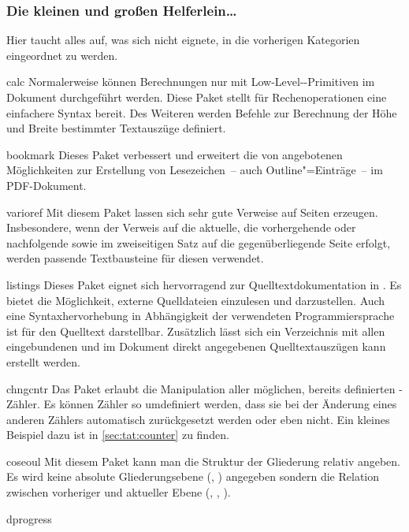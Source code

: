 \documentclass[%
  english,ngerman,%
  headings=optiontoheadandtoc,captions=tableheading,numbers=noenddot,%
  chapterpage,cdfoot,%
]{tudscrman}
\begin{document}
\subsubsection{Die kleinen und großen Helferlein\dots}
Hier taucht alles auf, was sich nicht eignete, in die vorherigen Kategorien 
eingeordnet zu werden.
\begin{packages}
\item[calc]
  Normalerweise können Berechnungen nur mit Low-Level--Primitiven im 
  Dokument durchgeführt werden. Diese Paket stellt für Rechenoperationen eine 
  einfachere Syntax bereit. Des Weiteren werden Befehle zur Berechnung der Höhe
  und Breite bestimmter Textauszüge definiert.
\item[bookmark]
  Dieses Paket verbessert und erweitert die von  angebotenen 
  Möglichkeiten zur Erstellung von Lesezeichen~-- auch Outline"=Einträge~-- im 
  PDF-Dokument.
\item[varioref]
  Mit diesem Paket lassen sich sehr gute Verweise auf Seiten erzeugen. 
  Insbesondere, wenn der Verweis auf die aktuelle, die vorhergehende oder 
  nachfolgende sowie im zweiseitigen Satz auf die gegenüberliegende Seite 
  erfolgt, werden passende Textbausteine für diesen verwendet.
\item[listings]
  Dieses Paket eignet sich hervorragend zur Quelltextdokumentation in 
  . Es bietet die Möglichkeit, externe Quelldateien einzulesen und 
  darzustellen. Auch eine Syntaxhervorhebung in Abhängigkeit der verwendeten 
  Programmiersprache ist für den Quelltext darstellbar. Zusätzlich lässt sich 
  ein Verzeichnis mit allen eingebundenen und im Dokument direkt angegebenen 
  Quelltextauszügen kann erstellt werden.
\item[chngcntr]
  Das Paket erlaubt die Manipulation aller möglichen, bereits definierten 
  -Zähler. Es können Zähler so umdefiniert werden, dass sie bei 
  der Änderung eines anderen Zählers automatisch zurückgesetzt werden oder eben 
  nicht. Ein kleines Beispiel dazu ist in \autoref{sec:tat:counter} zu finden.
\item[coseoul]
  Mit diesem Paket kann man die Struktur der Gliederung relativ angeben. Es wird 
  keine absolute Gliederungsebene (, ) angegeben 
  sondern die Relation zwischen vorheriger und aktueller Ebene 
  (, , ).
\item[dprogress]

\end{packages}
\end{document}
